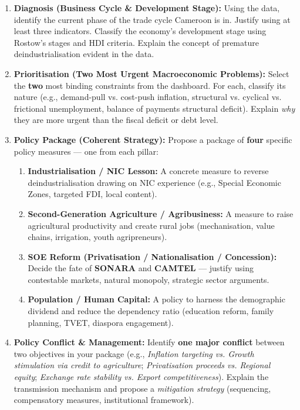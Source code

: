 \documentclass[11pt]{article}
\newcommand{\cle}[1]{{\popxbold\color{popdark}#1}}
\begin{document}
\begin{enumerate}
    \item \textbf{Diagnosis (Business Cycle \& Development Stage):} Using the data, identify the current phase of the \cle{trade cycle} Cameroon is in. Justify using at least three indicators. Classify the economy's development stage using \cle{Rostow's stages} and \cle{HDI} criteria. Explain the concept of \cle{premature deindustrialisation} evident in the data.
    \item \textbf{Prioritisation (Two Most Urgent Macroeconomic Problems):} Select the \textbf{two} most binding constraints from the dashboard. For each, classify its nature (e.g., \cle{demand-pull vs. cost-push inflation}, \cle{structural vs. cyclical vs. frictional unemployment}, \cle{balance of payments structural deficit}). Explain \emph{why} they are more urgent than the fiscal deficit or debt level.
    \item \textbf{Policy Package (Coherent Strategy):} Propose a package of \textbf{four} specific policy measures — one from each pillar:
        \begin{enumerate}
            \item \textbf{Industrialisation / NIC Lesson:} A concrete measure to reverse deindustrialisation drawing on NIC experience (e.g., Special Economic Zones, targeted FDI, local content).
            \item \textbf{Second-Generation Agriculture / Agribusiness:} A measure to raise agricultural productivity and create rural jobs (mechanisation, value chains, irrigation, youth agripreneurs).
            \item \textbf{SOE Reform (Privatisation / Nationalisation / Concession):} Decide the fate of \textbf{SONARA} and \textbf{CAMTEL} — justify using \cle{contestable markets}, \cle{natural monopoly}, \cle{strategic sector} arguments.
            \item \textbf{Population / Human Capital:} A policy to harness the \cle{demographic dividend} and reduce the dependency ratio (education reform, family planning, TVET, diaspora engagement).
        \end{enumerate}
    \item \textbf{Policy Conflict \& Management:} Identify \textbf{one major conflict} between two objectives in your package (e.g., \emph{Inflation targeting vs. Growth stimulation via credit to agriculture}; \emph{Privatisation proceeds vs. Regional equity}; \emph{Exchange rate stability vs. Export competitiveness}). Explain the transmission mechanism and propose a \emph{mitigation strategy} (sequencing, compensatory measures, institutional framework).
\end{enumerate}
\end{document}
